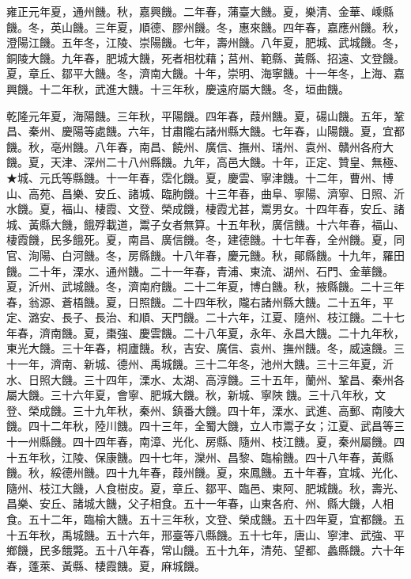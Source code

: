 \begin{pinyinscope}
雍正元年夏，通州饑。秋，嘉興饑。二年春，蒲臺大饑。夏，樂清、金華、嵊縣饑。冬，英山饑。三年夏，順德、膠州饑。冬，惠來饑。四年春，嘉應州饑。秋，澄陽江饑。五年冬，江陵、崇陽饑。七年，壽州饑。八年夏，肥城、武城饑。冬，銅陵大饑。九年春，肥城大饑，死者相枕藉；莒州、範縣、黃縣、招遠、文登饑。夏，章丘、鄒平大饑。冬，濟南大饑。十年，崇明、海寧饑。十一年冬，上海、嘉興饑。十二年秋，武進大饑。十三年秋，慶遠府屬大饑。冬，垣曲饑。

乾隆元年夏，海陽饑。三年秋，平陽饑。四年春，葭州饑。夏，碭山饑。五年，鞏昌、秦州、慶陽等處饑。六年，甘肅隴右諸州縣大饑。七年春，山陽饑。夏，宜都饑。秋，亳州饑。八年春，南昌、饒州、廣信、撫州、瑞州、袁州、贛州各府大饑。夏，天津、深州二十八州縣饑。九年，高邑大饑。十年，正定、贊皇、無極、★城、元氏等縣饑。十一年春，霑化饑。夏，慶雲、寧津饑。十二年，曹州、博山、高苑、昌樂、安丘、諸城、臨朐饑。十三年春，曲阜、寧陽、濟寧、日照、沂水饑。夏，福山、棲霞、文登、榮成饑，棲霞尤甚，鬻男女。十四年春，安丘、諸城、黃縣大饑，餓殍載道，鬻子女者無算。十五年秋，廣信饑。十六年春，福山、棲霞饑，民多餓死。夏，南昌、廣信饑。冬，建德饑。十七年春，全州饑。夏，同官、洵陽、白河饑。冬，房縣饑。十八年春，慶元饑。秋，鄖縣饑。十九年，羅田饑。二十年，溧水、通州饑。二十一年春，青浦、東流、湖州、石門、金華饑。夏，沂州、武城饑。冬，濟南府饑。二十二年夏，博白饑。秋，掖縣饑。二十三年春，翁源、蒼梧饑。夏，日照饑。二十四年秋，隴右諸州縣大饑。二十五年，平定、潞安、長子、長治、和順、天門饑。二十六年，江夏、隨州、枝江饑。二十七年春，濟南饑。夏，棗強、慶雲饑。二十八年夏，永年、永昌大饑。二十九年秋，東光大饑。三十年春，桐廬饑。秋，吉安、廣信、袁州、撫州饑。冬，威遠饑。三十一年，濟南、新城、德州、禹城饑。三十二年冬，池州大饑。三十三年夏，沂水、日照大饑。三十四年，溧水、太湖、高淳饑。三十五年，蘭州、鞏昌、秦州各屬大饑。三十六年夏，會寧、肥城大饑。秋，新城、寧陜饑。三十八年秋，文登、榮成饑。三十九年秋，秦州、鎮番大饑。四十年，溧水、武進、高郵、南陵大饑。四十二年秋，陸川饑。四十三年，全蜀大饑，立人市鬻子女；江夏、武昌等三十一州縣饑。四十四年春，南漳、光化、房縣、隨州、枝江饑。夏，秦州屬饑。四十五年秋，江陵、保康饑。四十七年，灤州、昌黎、臨榆饑。四十八年春，黃縣饑。秋，綏德州饑。四十九年春，葭州饑。夏，來鳳饑。五十年春，宜城、光化、隨州、枝江大饑，人食樹皮。夏，章丘、鄒平、臨邑、東阿、肥城饑。秋，壽光、昌樂、安丘、諸城大饑，父子相食。五十一年春，山東各府、州、縣大饑，人相食。五十二年，臨榆大饑。五十三年秋，文登、榮成饑。五十四年夏，宜都饑。五十五年秋，禹城饑。五十六年，邢臺等八縣饑。五十七年，唐山、寧津、武強、平鄉饑，民多餓斃。五十八年春，常山饑。五十九年，清苑、望都、蠡縣饑。六十年春，蓬萊、黃縣、棲霞饑。夏，麻城饑。


\end{pinyinscope}
